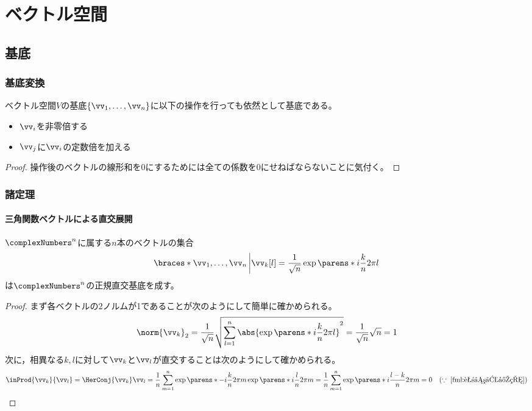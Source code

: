 \chapter{ベクトル空間}
    \section{基底}
        \subsection{基底変換}
            \begin{shadebox}
                ベクトル空間$V$の基底$\{\vv_1,\dotsc,\vv_n\}$に以下の操作を行っても依然として基底である。
                \begin{itemize}
                    \item $\vv_i$を非零倍する
                    \item $\vv_j$に$\vv_i$の定数倍を加える
                \end{itemize}
            \end{shadebox}
            \begin{proof}
                操作後のベクトルの線形和を0にするためには全ての係数を0にせねばならないことに気付く。
            \end{proof}
        \subsection{諸定理}
            \subsubsection{三角関数ベクトルによる直交展開}
                \begin{shadebox}
                    $\complexNumbers^n$に属する$n$本のベクトルの集合
                    \[\braces*{\vv_1,\dotsc,\vv_n \left| \vv_k[l] = \frac{1}{\sqrt{n}}\exp\parens*{i\frac{k}{n}2\pi l} \right. }\]
                    は$\complexNumbers^n$の正規直交基底を成す。
                \end{shadebox}
                \begin{proof}
                    まず各ベクトルの2ノルムが1であることが次のようにして簡単に確かめられる。
                    \[\norm{\vv_k}_2 = \frac{1}{\sqrt{n}}\sqrt{\sum_{l=1}^n{\abs{\exp\parens*{i\frac{k}{n}2\pi l}}^2}} = \frac{1}{\sqrt{n}}\sqrt{n} = 1\]
                    次に，相異なる$k,l$に対して$\vv_k$と$\vv_l$が直交することは次のようにして確かめられる。
                    \[\inProd{\vv_k}{\vv_l} = \HerConj{{\vv_k}}\vv_l = \frac{1}{n}\sum_{m=1}^n{\exp\parens*{-i\frac{k}{n}2\pi m}\exp\parens*{i\frac{l}{n}2\pi m}} = \frac{1}{n}\sum_{m=1}^n{\exp\parens*{i\frac{l-k}{n}2\pi m}} = 0\quad(\because\;\ref{fml:花びら定理})\]
                \end{proof}
